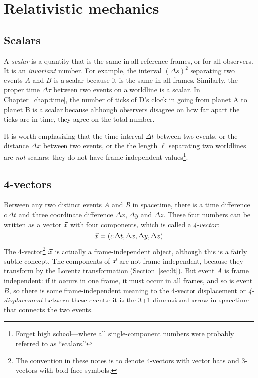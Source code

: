 \chapter{Relativistic mechanics}
\label{chap:mechanics}


\section{Scalars}
\label{sec:scalars}

A {\em scalar\/} is a quantity that is the same in all reference
frames, or for all observers.  It is an {\em invariant\/} number.  For
example, the interval $(\Delta s)^2$ separating two events $A$ and $B$
is a scalar because it is the same in all frames.  Similarly, the
proper time $\Delta\tau$ between two events on a worldline is a
scalar.  In Chapter~\ref{chap:time}, the number of ticks of D's clock
in going from planet A to planet B is a scalar because although
observers disagree on how far apart the ticks are in time, they agree
on the total number.

It is worth emphasizing that the time interval $\Delta t$ between two
events, or the distance $\Delta x$ between two events, or the the
length $\ell$ separating two worldlines are {\em not\/} scalars: they
do not have frame-independent values\footnote{Forget high
school---where all single-component numbers were probably referred to
as ``scalars.''}.


\section{4-vectors}
\label{sec:4-vectors}

Between any two distinct events $A$ and $B$ in spacetime, there is a
time difference $c\,\Delta t$ and three coordinate difference $\Delta
x$, $\Delta y$ and $\Delta z$.  These four numbers can be written as a
vector $\vec{x}$ with four components, which is called a {\em
4-vector\/}:
\begin{equation}
\vec{x} = (c\,\Delta t, \Delta x, \Delta y, \Delta z)
\end{equation}
The 4-vector\footnote{The convention in these notes is to denote
4-vectors with vector hats and 3-vectors with bold face symbols.}
$\vec{x}$ is actually a frame-independent object, although this is a
fairly subtle concept.  The components of $\vec{x}$ are not
frame-independent, because they transform by the Lorentz
transformation (Section~\ref{sec:lt}).  But event $A$ is frame
independent: if it occurs in one frame, it must occur in all frames,
and so is event $B$, so there is some frame-independent meaning to the
4-vector displacement or {\em 4-displacement\/} between these events:
it is the 3+1-dimensional arrow in spacetime that connects the two
events.

